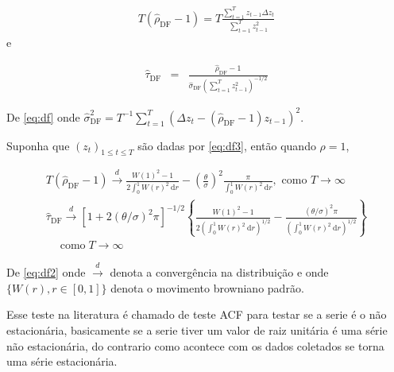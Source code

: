 \begin{eqnarray}
	T\left(\hat{\rho}_{\mathrm{DF}}-1\right)=T \frac{\sum_{t=1}^T z_{t-1} \Delta z_t}{\sum_{t=1}^T z_{t-1}^2}
\end{eqnarray}
e


\begin{eqnarray}
	\hat{\tau}_{\mathrm{DF}}&=&\frac{\hat{\rho}_{\mathrm{DF}}-1}{\hat{\sigma}_{\mathrm{DF}}\left(\sum_{t=1}^T z_{t-1}^2\right)^{-1 / 2}} \label{eq:df}
\end{eqnarray}

De \eqref{eq:df} onde $\hat{\sigma}_{\mathrm{DF}}^2=T^{-1} \sum_{t=1}^T\left(\Delta z_t-\left(\hat{\rho}_{\mathrm{DF}}-1\right) z_{t-1}\right)^2 .$



Suponha que $\left(z_t\right)_{1 \leq t \leq T}$ são dadas por \eqref{eq:df3}, então quando $\rho=1$,


\begin{eqnarray}
	T\left(\hat{\rho}_{\mathrm{DF}}-1\right) \stackrel{d}{\longrightarrow} \frac{W(1)^2-1}{2 \int_0^1 W(r)^2 \mathrm{~d} r}-\left(\frac{\theta}{\sigma}\right)^2 \frac{\pi}{\int_0^1 W(r)^2 \mathrm{~d} r}, \text { como } T \rightarrow \infty \\
	\hat{\tau}_{\mathrm{DF}} \stackrel{d}{\longrightarrow}\left[1+2(\theta / \sigma)^2 \pi\right]^{-1 / 2}\left\{\frac{W(1)^2-1}{2\left(\int_0^1 W(r)^2 \mathrm{~d} r\right)^{1 / 2}}-\frac{(\theta / \sigma)^2 \pi}{\left(\int_0^1 W(r)^2 \mathrm{~d} r\right)^{1 / 2}}\right\} \\
	\quad \operatorname{como} T \rightarrow \infty\label{eq:df2}
\end{eqnarray}


De \eqref{eq:df2} onde $\stackrel{d}{\longrightarrow}$ denota a convergência na distribuição e onde $\{W(r), r \in[0,1]\}$ denota o movimento browniano padrão.

Esse teste na literatura é chamado de teste ACF para testar se a serie é o não estacionária, basicamente se a serie tiver um valor de raiz unitária é uma série não estacionária, do contrario como acontece com os dados coletados se torna uma série estacionária.


